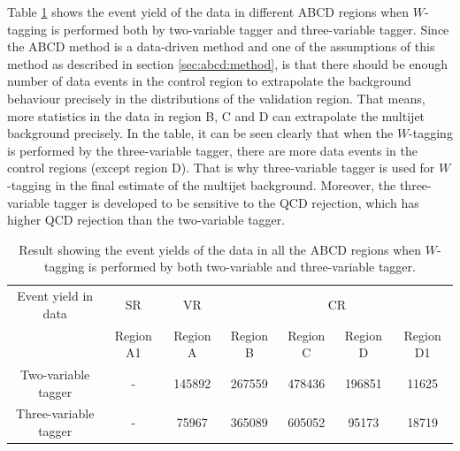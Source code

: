 Table \ref{table:results:taggers} shows the event yield of the data in different ABCD regions when $W$-tagging is performed both by two-variable tagger and three-variable tagger. Since the ABCD method is a data-driven method and one of the assumptions of this method as described in section \ref{sec:abcd:method}, is that there should be enough number of data events in the control region to extrapolate the background behaviour precisely in the distributions of the validation region. That means, more statistics in the data in region B, C and D can extrapolate the multijet background precisely. In the table, it can be seen clearly that when the $W$-tagging is performed by the three-variable tagger, there are more data events in the control regions (except region D). That is why three-variable tagger is used for $W$-tagging in the final estimate of the multijet background. Moreover, the three-variable tagger is developed to be sensitive to the QCD rejection, which has higher QCD rejection than the two-variable tagger.


\begin{table}[hbt!]
	\centering
	\begin{tabular}{c | c | c | c | c | c | c} 
		\toprule
		Event yield in data & SR & VR & \multicolumn{4}{c}{CR} \\ \cline{2-7}
		& Region A1 & Region A & Region B & Region C & Region D & Region D1 \\
		\midrule
		Two-variable tagger & - & \num{145892} & \num{267559} & \num{478436} & \num{196851} & \num{11625} \\
		Three-variable tagger & - & \num{75967} & \num{365089} & \num{605052} & \num{95173} & \num{18719} \\
		\bottomrule
	\end{tabular}
	\caption{Result showing the event yields of the data in all the ABCD regions when $W$-tagging is performed by both two-variable and three-variable tagger.}
	\label{table:results:taggers}
\end{table}

